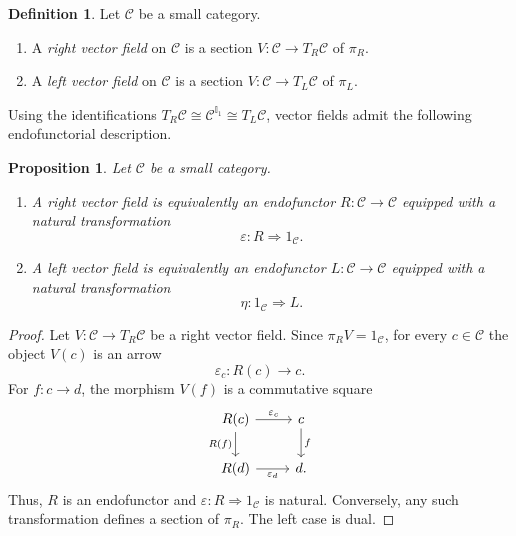 \documentclass[12pt]{amsart}
\newtheorem{proposition}[teo]{Proposition}
\theoremstyle{definition}
\newtheorem{definition}[teo]{Definition}
\theoremstyle{remark}
\numberwithin{figure}{section}%
\newcommand{\CC}{\mathcal{C}}
\begin{document}
\begin{definition}\label{def:categorical_vector_fields}
Let \(\CC\) be a small category.

\begin{enumerate}
    \item A \emph{right vector field} on \(\CC\) is a section
    \(
    V\colon\CC\longrightarrow T_R\CC
    \)
    of \(\pi_R\).

    \item A \emph{left vector field} on \(\CC\) is a section
    \(
    V\colon\CC\longrightarrow T_L\CC
    \)
    of \(\pi_L\).
\end{enumerate}
\end{definition}

Using the identifications
\(T_R\CC\cong\CC^{\mathbb I_1}\cong T_L\CC\), vector fields admit the
following endofunctorial description.

\begin{proposition}\label{prop:vector_fields_natural_transformations}
Let \(\CC\) be a small category.

\begin{enumerate}
    \item A right vector field is equivalently an endofunctor
    \(R\colon\CC\to\CC\) equipped with a natural transformation
    \[
    \varepsilon\colon R\Rightarrow1_\CC.
    \]

    \item A left vector field is equivalently an endofunctor
    \(L\colon\CC\to\CC\) equipped with a natural transformation
    \[
    \eta\colon1_\CC\Rightarrow L.
    \]
\end{enumerate}
\end{proposition}

\begin{proof}
Let \(V\colon\CC\to T_R\CC\) be a right vector field. Since
\(\pi_RV=1_\CC\), for every \(c\in\CC\) the object \(V(c)\) is an arrow
\[
\varepsilon_c\colon R(c)\longrightarrow c.
\]
For \(f\colon c\to d\), the morphism \(V(f)\) is a commutative square
\[
\begin{tikzcd}
R(c) \arrow[r, "\varepsilon_c"] \arrow[d, "R(f)"']
&
c \arrow[d, "f"]
\\
R(d) \arrow[r, "\varepsilon_d"']
&
d.
\end{tikzcd}
\]
Thus, \(R\) is an endofunctor and
\(\varepsilon\colon R\Rightarrow1_\CC\) is natural. Conversely, any such
transformation defines a section of \(\pi_R\). The left case is dual.
\end{proof}
\end{document}
